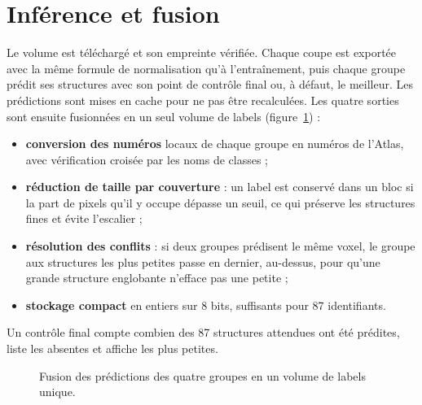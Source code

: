 \documentclass[12pt,a4paper]{report}
\begin{document}
\section{Inférence et fusion}

Le volume est téléchargé et son empreinte vérifiée. Chaque coupe est exportée avec la même formule de normalisation qu'à l'entraînement, puis chaque groupe prédit ses structures avec son point de contrôle final ou, à défaut, le meilleur. Les prédictions sont mises en cache pour ne pas être recalculées. Les quatre sorties sont ensuite fusionnées en un seul volume de labels (figure~\ref{fig:fusion}) :
\begin{itemize}
    \item \textbf{conversion des numéros} locaux de chaque groupe en numéros de l'Atlas, avec vérification croisée par les noms de classes ;
    \item \textbf{réduction de taille par couverture} : un label est conservé dans un bloc si la part de pixels qu'il y occupe dépasse un seuil, ce qui préserve les structures fines et évite l'escalier ;
    \item \textbf{résolution des conflits} : si deux groupes prédisent le même voxel, le groupe aux structures les plus petites passe en dernier, au-dessus, pour qu'une grande structure englobante n'efface pas une petite ;
    \item \textbf{stockage compact} en entiers sur 8 bits, suffisants pour 87 identifiants.
\end{itemize}
Un contrôle final compte combien des 87 structures attendues ont été prédites, liste les absentes et affiche les plus petites.

\begin{figure}[H]
\centering
{}
\caption[Fusion des prédictions]{Fusion des prédictions des quatre groupes en un volume de labels unique.}
\label{fig:fusion}
\end{figure}
\end{document}
